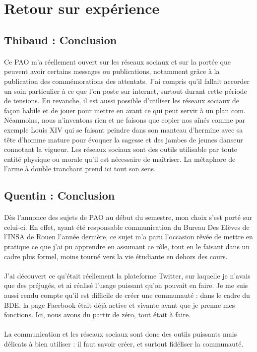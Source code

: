 \section{Retour sur expérience}
\subsection{Thibaud : Conclusion}

\paragraph{}
Ce PAO m'a réellement ouvert sur les réseaux sociaux et sur la portée que peuvent avoir certains messages ou publications, notamment grâce à la publication des commémorations des attentats. J'ai compris qu'il fallait 
accorder un soin particulier à ce que l'on poste sur internet, surtout durant cette période de tensions. En revanche, il est aussi possible d'utiliser les réseaux sociaux de façon habile et de jouer pour mettre en 
avant ce qui peut servir à un plan com.
Néanmoins, nous n'inventons rien et ne faisons que copier nos aînés comme par exemple Louis XIV qui se faisant peindre dans son manteau d'hermine avec sa tête d'homme mature pour évoquer la sagesse et des jambes 
de jeunes danseur connotant la vigueur.
Les réseaux sociaux sont des outils utilisable par toute entité physique ou morale qu'il est nécessaire de maîtriser. La métaphore de l'arme à double tranchant prend ici tout son sens.

\subsection{Quentin : Conclusion}

\paragraph{}
Dès l'annonce des sujets de PAO au début du semestre, mon choix s'est porté sur celui-ci. En effet, ayant été responsable communication du Bureau Des Elèves de l'INSA de Rouen l'année dernière, ce sujet m'a paru 
l'occasion rêvée de mettre en pratique ce que j'ai pu apprendre en assumant ce rôle, tout en le faisant dans un cadre plus formel, moins tourné vers la vie étudiante en dehors des cours.

\paragraph{}
J'ai découvert ce qu'était réellement la plateforme Twitter, sur laquelle je n'avais que des préjugés, et ai réalisé l'usage puissant qu'on pouvait en faire. Je me suis aussi rendu compte qu'il est difficile de 
créer une communauté : dans le cadre du BDE, la page Facebook était déjà active et vivante avant que je prenne mes fonctions. Ici, nous avons du partir de zéro, tout était à faire.

\paragraph{}
La communication et les réseaux sociaux sont donc des outils puissants mais délicats à bien utiliser : il faut savoir créer, et surtout fidéliser la communauté.
